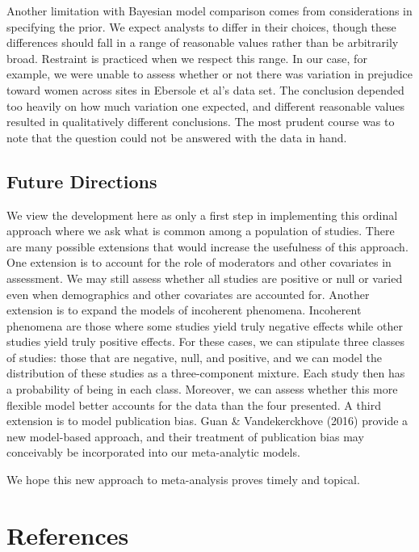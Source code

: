 \documentclass[english,man]{apa6}
\theoremstyle{definition}
\theoremstyle{definition}
\theoremstyle{remark}
\begin{document}
Another limitation with Bayesian model comparison comes from
considerations in specifying the prior. We expect analysts to differ in
their choices, though these differences should fall in a range of
reasonable values rather than be arbitrarily broad. Restraint is
practiced when we respect this range. In our case, for example, we were
unable to assess whether or not there was variation in prejudice toward
women across sites in Ebersole et al's data set. The conclusion depended
too heavily on how much variation one expected, and different reasonable
values resulted in qualitatively different conclusions. The most prudent
course was to note that the question could not be answered with the data
in hand.

\subsection{Future Directions}\label{future-directions}

We view the development here as only a first step in implementing this
ordinal approach where we ask what is common among a population of
studies. There are many possible extensions that would increase the
usefulness of this approach. One extension is to account for the role of
moderators and other covariates in assessment. We may still assess
whether all studies are positive or null or varied even when
demographics and other covariates are accounted for. Another extension
is to expand the models of incoherent phenomena. Incoherent phenomena
are those where some studies yield truly negative effects while other
studies yield truly positive effects. For these cases, we can stipulate
three classes of studies: those that are negative, null, and positive,
and we can model the distribution of these studies as a three-component
mixture. Each study then has a probability of being in each class.
Moreover, we can assess whether this more flexible model better accounts
for the data than the four presented. A third extension is to model
publication bias. Guan \& Vandekerckhove (2016) provide a new
model-based approach, and their treatment of publication bias may
conceivably be incorporated into our meta-analytic models.

We hope this new approach to meta-analysis proves timely and topical.

\newpage

\section*{References}\label{references}
\end{document}
